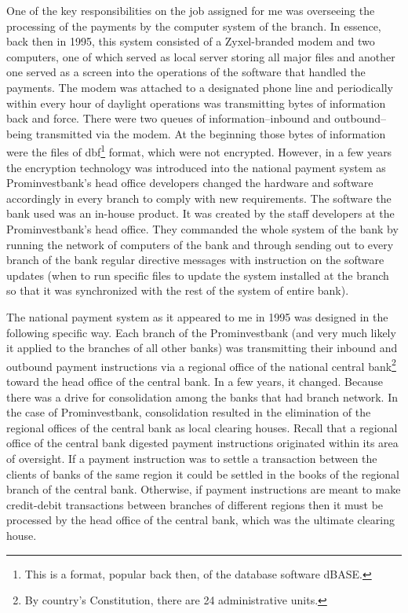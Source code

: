 One of the key responsibilities on the job assigned for me was overseeing the processing of the payments by the computer system of the branch. In essence, back then in 1995, this system consisted of a Zyxel-branded modem and two computers, one of which served as local server storing all major files and another one served as a screen into the operations of the software that handled the payments. The modem was attached to a designated phone line and periodically within every hour of daylight operations was transmitting bytes of information back and force. There were two queues of information--inbound and outbound--being transmitted via the modem. At the beginning those bytes of information were the files of dbf\footnote{This is a format, popular back then, of the database software dBASE.} format, which were not encrypted. However, in a few years the encryption technology was introduced into the national payment system as Prominvestbank's head office developers changed the hardware and software accordingly in every branch to comply with new requirements. The software the bank used was an in-house product. It was created by the staff developers at the Prominvestbank's head office. They commanded the whole system of the bank by running the network of computers of the bank and through sending out to every branch of the bank regular directive messages with instruction on the software updates (when to run specific files to update the system installed at the branch so that it was synchronized with the rest of the system of entire bank).

The national payment system as it appeared to me in 1995 was designed in the following specific way. Each branch of the Prominvestbank (and very much likely it applied to the branches of all other banks) was transmitting their inbound and outbound payment instructions via a regional office of the national central bank\footnote{By country's Constitution, there are 24 administrative units.} toward the head office of the central bank. In a few years, it changed. Because there was a drive for consolidation among the banks that had branch network. In the case of Prominvestbank, consolidation resulted in the elimination of the regional offices of the central bank as local clearing houses. Recall that a regional office of the central bank digested payment instructions originated within its area of oversight. If a payment instruction was to settle a transaction between the clients of banks of the same region it could be settled in the books of the regional branch of the central bank. Otherwise, if payment instructions are meant to make credit-debit transactions between branches of different regions then it must be processed by the head office of the central bank, which was the ultimate clearing house.

